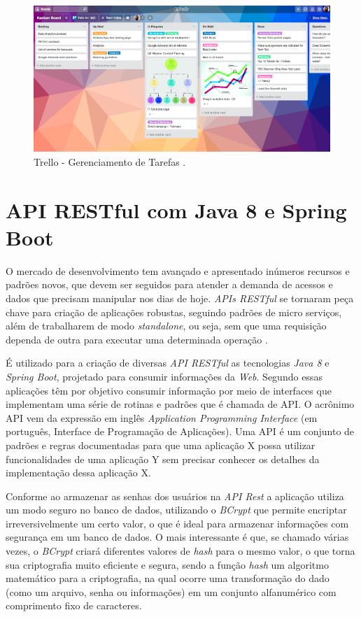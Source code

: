     \begin{figure}[h]
    \centering
    \includegraphics[width=1.0
    \textwidth]{./img/Trello.png}
    \caption{Trello - Gerenciamento de Tarefas .}
    \label{fig:Trello}
    \end{figure}

\section{API RESTful com Java 8 e Spring Boot}

    O mercado de desenvolvimento tem avançado e apresentado inúmeros recursos e padrões novos, que devem ser seguidos para atender a demanda de acessos e dados que precisam manipular nos dias de hoje. \textit{APIs RESTful} se tornaram peça chave para criação de aplicações robustas, seguindo padrões de micro serviços, além de trabalharem de modo \textit{standalone}, ou seja, sem que uma requisição dependa de outra para executar uma determinada operação \cite{souza}.

    É utilizado para a criação de diversas \textit{API RESTful} as tecnologias \textit{Java 8} e \textit{Spring Boot}, projetado para consumir informações da \textit{Web}. Segundo  essas aplicações têm por objetivo consumir informação por meio de interfaces que implementam uma série de rotinas e padrões que é chamada de API. O acrônimo API vem da expressão em inglês \textit{Application Programming Interface} (em português, Interface de Programação de Aplicações). Uma API é um conjunto de padrões e regras documentadas para que uma aplicação X possa utilizar funcionalidades de uma aplicação Y sem precisar conhecer os detalhes da implementação dessa aplicação X.

   Conforme \cite{vale} ao armazenar as senhas dos usuários na \textit{API Rest} a aplicação utiliza um modo seguro no banco de dados, utilizando o \textit{BCrypt} que permite encriptar irreversivelmente um certo valor, o que é ideal para armazenar informações com segurança em um banco de dados. O mais interessante é que, se chamado várias vezes, o \textit{BCrypt} criará diferentes valores de \textit{hash} para o mesmo valor, o que torna sua criptografia muito eficiente e segura, sendo a função \textit{hash} um algoritmo matemático para a criptografia, na qual ocorre uma transformação do dado (como um arquivo, senha ou informações) em um conjunto alfanumérico com comprimento fixo de caracteres.
   
